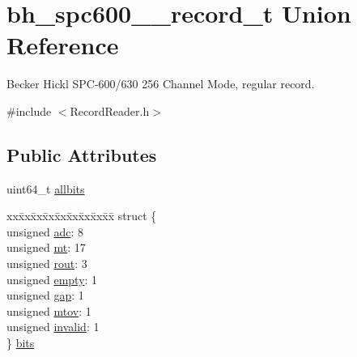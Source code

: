 \hypertarget{unionbh__spc600__256__record__t}{}\section{bh\+\_\+spc600\+\_\+\_\+record\+\_\+t Union Reference}
\label{unionbh__spc600__256__record__t}


Becker Hickl S\+P\+C-\/600/630 256 Channel Mode, regular record.  




{\ttfamily \#include $<$Record\+Reader.\+h$>$}

\subsection*{Public Attributes}
\begin{DoxyCompactItemize}
\item 
uint64\+\_\+t \hyperlink{unionbh__spc600__256__record__t_a50c6cceb18635490278607e87925b5e6}{allbits}
\item 
\begin{tabbing}
xx\=xx\=xx\=xx\=xx\=xx\=xx\=xx\=xx\=\kill
struct \{\\
\>unsigned \hyperlink{unionbh__spc600__256__record__t_aa2d37a972a2e917486da43df75a101b1}{adc}: 8\\
\>unsigned \hyperlink{unionbh__spc600__256__record__t_ae3d8fd789c87981ebfa61e393c6536b8}{mt}: 17\\
\>unsigned \hyperlink{unionbh__spc600__256__record__t_abc4d64c4d51cdd83fbe8c65a902255f8}{rout}: 3\\
\>unsigned \hyperlink{unionbh__spc600__256__record__t_afd0673e53b06c0fbba82226b43cb670f}{empty}: 1\\
\>unsigned \hyperlink{unionbh__spc600__256__record__t_aaac5257ec567817ca8f4cc353b045946}{gap}: 1\\
\>unsigned \hyperlink{unionbh__spc600__256__record__t_a732e62a3c7a46ba4bc4d59af9412e324}{mtov}: 1\\
\>unsigned \hyperlink{unionbh__spc600__256__record__t_a2dec78cc5884e44ba46f8ea69a9674dc}{invalid}: 1\\
\} \hyperlink{unionbh__spc600__256__record__t_ad37a57f11aec06f8628d5cfae67ad704}{bits}\\

\end{tabbing}\end{DoxyCompactItemize}


